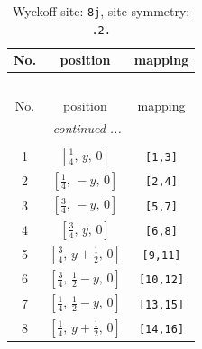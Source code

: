 \documentclass[fleqn,8pt]{jsarticle}
\begin{document}
\begin{longtable}{ccc}
\caption{Wyckoff site: {\tt 8j}, site symmetry: {\tt .2.}}
 \\
 \hline \hline
No. & position & mapping \\ \hline \endfirsthead

\multicolumn{2}{l}{\tablename\ \thetable{}} \\
 \hline \hline
No. & position & mapping \\ \hline \endhead

 \hline \hline
\multicolumn{2}{r}{\footnotesize\it continued ...} \\ \endfoot

 \hline \hline
\multicolumn{2}{r}{} \\ \endlastfoot

1 & $\left[ \frac{1}{4},\, y,\, 0 \right]$ & {\tt [1,3]} \\ \hline
2 & $\left[ \frac{1}{4},\, - y,\, 0 \right]$ & {\tt [2,4]} \\ \hline
3 & $\left[ \frac{3}{4},\, - y,\, 0 \right]$ & {\tt [5,7]} \\ \hline
4 & $\left[ \frac{3}{4},\, y,\, 0 \right]$ & {\tt [6,8]} \\ \hline
5 & $\left[ \frac{3}{4},\, y + \frac{1}{2},\, 0 \right]$ & {\tt [9,11]} \\ \hline
6 & $\left[ \frac{3}{4},\, \frac{1}{2} - y,\, 0 \right]$ & {\tt [10,12]} \\ \hline
7 & $\left[ \frac{1}{4},\, \frac{1}{2} - y,\, 0 \right]$ & {\tt [13,15]} \\ \hline
8 & $\left[ \frac{1}{4},\, y + \frac{1}{2},\, 0 \right]$ & {\tt [14,16]} \\
\end{longtable}
\renewcommand{\arraystretch}{1.2}
\end{document}
